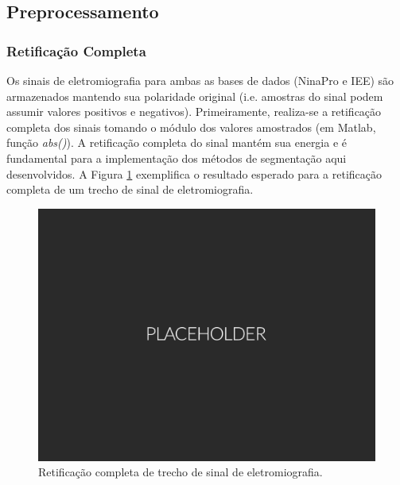 

			\subsection {Preprocessamento}
				\subsubsection{Retificação Completa}
Os sinais de eletromiografia para ambas as bases de dados (NinaPro e IEE) são armazenados mantendo sua polaridade original (i.e. amostras do sinal podem assumir valores positivos e negativos). Primeiramente, realiza-se a retificação completa dos sinais tomando o módulo dos valores amostrados (em Matlab, função \emph{abs()}). A retificação completa do sinal mantém sua energia e é fundamental para a implementação dos métodos de segmentação aqui desenvolvidos. A Figura \ref{fig:rectification} exemplifica o resultado esperado para a retificação completa de um trecho de sinal de eletromiografia.

\begin{figure}[htb]
	\caption{\label{fig:rectification} Retificação completa de trecho de sinal de eletromiografia.}
	\begin{center}
	    \includegraphics[width=0.75\linewidth]{./img/placeholder.png}
	\end{center}
\end{figure}


